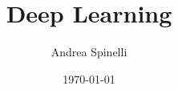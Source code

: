 \documentclass[a4paper,12pt]{report}
\institute{UniTs - University of Trieste}
\title{Deep Learning}
\author{Andrea Spinelli}
\date{\today}
\begin{document}
\maketitle



\toc


\printbibliography
\end{document}
